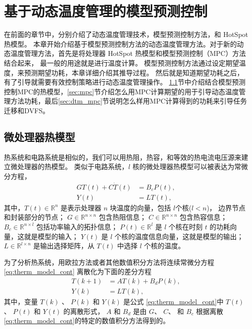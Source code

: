 
\chapter{基于动态温度管理的模型预测控制}

在前面的章节中，分别介绍了动态温度管理技术，模型预测控制方法，和 HotSpot 热模型。
本章开始介绍基于模型预测控制方法的动态温度管理方法。对于新的动态温度管理方法，首先是将处理器 HotSpot 热模型和模型预测控制（MPC）方法结合起来，
最一般的用途就是进行温度计算。
模型预测控制方法通过设定期望温度，来预测期望功耗，本章详细介绍其推导过程。
然后就是知道期望功耗之后，有了引导就需要有效控制策略进行动态温度管理操作。
\ref{sec:therm_model}节中介绍结合模型预测控制MPC的热模型，\ref{sec:mpc}节介绍怎么用MPC计算期望的用于引导动态温度管理方法功耗，最后\ref{sec:dtm_mpc}节说明怎么样用MPC计算得到的功耗来引导任务迁移和DVFS。
\section{微处理器热模型}\label{sec:therm_model}
热系统和电路系统是相似的，我们可以用热阻，热容，和等效的热电流电压源来建立微处理器的热模型。
类似于电路系统，$l$ 核的微处理器热模型可以被表达为常微分方程，
\begin{equation}\label{eq:therm_model_cont} 
\begin{split}
G T(t) + C \dot{T}(t) &= B_c P(t),\\
Y(t) &= L T(t),
\end{split}
\end{equation}
其中，$T(t) \in \mathbb{R}^n$ 是表示处理器 $n$ 块温度的向量，包括 $l$个核($l < n$)， 边界节点和封装部分的节点；
$G \in \mathbb{R}^{n\times n}$ 包含热阻信息； 
$C \in \mathbb{R}^{n \times n}$ 包含热容信息；
$B_c \in \mathbb{R}^{n \times l}$ 包括功率输入的拓扑信息；
$P(t) \in \mathbb{R}^{l}$ 是 $l$ 个核在时刻 $t$ 的功耗向量，这就是模型的输入；
$Y(t)$ 是 $l$ 个核的温度信息向量，这就是模型的输出；
$L \in \mathbb{R}^{l \times n}$ 是输出选择矩阵，从 $T(t)$ 中选择 $l$ 个核的温度。

为了分析热系统，用欧拉方法或者其他数值积分方法将连续常微分方程 \eqref{eq:therm_model_cont} 离散化为下面的差分方程
\begin{equation}\label{eq:therm_model_disc}
\begin{split}
T(k+1) &= A T(k)+B_d P(k),\\
Y(k) &= L T(k),
\end{split}
\end{equation}
其中，变量 $T(k)$ 、 $P(k)$ 和 $Y(k)$ 是公式 \eqref{eq:therm_model_cont}中
$T(t)$ 、 $P(t)$ 和 $Y(t)$ 的离散形式，  $A$ 和
$B_d$ 是由 $G$、 $C$、 和 $B_c$ 根据离散\eqref{eq:therm_model_cont}的特定的数值积分方法得到的。


